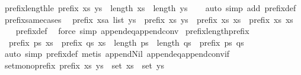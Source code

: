 \begin{isabellebody}
\ prefix{\isacharunderscore}length{\isacharunderscore}le{\isacharcolon}\ {\isachardoublequoteopen}prefix\ xs\ ys\ {\isasymLongrightarrow}\ length\ xs\ {\isasymle}\ length\ ys{\isachardoublequoteclose}\isanewline
%
\isadelimproof
\ \ %
\endisadelimproof
%
\isatagproof
{}\isamarkupfalse%
\ {\isacharparenleft}auto\ simp\ add{\isacharcolon}\ prefix{\isacharunderscore}def{\isacharparenright}%
\endisatagproof
{\isafoldproof}%
%
\isadelimproof
\isanewline
%
\endisadelimproof
\isanewline
{}\isamarkupfalse%
\ prefix{\isacharunderscore}same{\isacharunderscore}cases{\isacharcolon}\isanewline
\ \ {\isachardoublequoteopen}prefix\ {\isacharparenleft}xsa\ list{\isacharparenright}\ ys\ {\isasymLongrightarrow}\ prefix\ xs\ ys\ {\isasymLongrightarrow}\ prefix\ xs\ xs\ {\isasymor}\ prefix\ xs\ xs\isanewline
%
\isadelimproof
\ \ %
\endisadelimproof
%
\isatagproof
{}\isamarkupfalse%
\ prefix{\isacharunderscore}def\ \isamarkupfalse%
\ {\isacharparenleft}force\ simp{\isacharcolon}\ append{\isacharunderscore}eq{\isacharunderscore}append{\isacharunderscore}conv{}{\isacharparenright}%
\endisatagproof
{\isafoldproof}%
%
\isadelimproof
\isanewline
%
\endisadelimproof
\isanewline
{}\isamarkupfalse%
\ prefix{\isacharunderscore}length{\isacharunderscore}prefix{\isacharcolon}\isanewline
\ \ {\isachardoublequoteopen}prefix\ ps\ xs\ {\isasymLongrightarrow}\ prefix\ qs\ xs\ {\isasymLongrightarrow}\ length\ ps\ {\isasymle}\ length\ qs\ {\isasymLongrightarrow}\ prefix\ ps\ qs{\isachardoublequoteclose}\isanewline
%
\isadelimproof
%
\endisadelimproof
%
\isatagproof
{}\isamarkupfalse%
\ {\isacharparenleft}auto\ simp{\isacharcolon}\ prefix{\isacharunderscore}def{\isacharparenright}\ {\isacharparenleft}metis\ append{\isacharunderscore}Nil{}\ append{\isacharunderscore}eq{\isacharunderscore}append{\isacharunderscore}conv{\isacharunderscore}if{\isacharparenright}%
\endisatagproof
{\isafoldproof}%
%
\isadelimproof
\isanewline
%
\endisadelimproof
\isanewline
{}\isamarkupfalse%
\ set{\isacharunderscore}mono{\isacharunderscore}prefix{\isacharcolon}\ {\isachardoublequoteopen}prefix\ xs\ ys\ {\isasymLongrightarrow}\ set\ xs\ {\isasymsubseteq}\ set\ ys{\isachardoublequoteclose}\isanewline
%
\isadelimproof
\ \ %
\endisadelimproof
%
\isatagproof
{}\isamarkupfalse%

\end{isabellebody}
